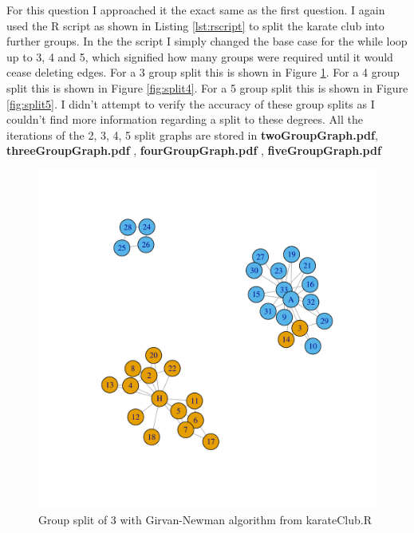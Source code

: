 \documentclass[letterpaper,11pt]{article}
\begin{document}
For this question I approached it the exact same as the first question. I again used the R script as shown in Listing \ref{lst:rscript} to split the karate club into further groups. In the the script I simply changed the base case for the while loop up to 3, 4 and 5, which signified how many groups were required until it would cease deleting edges. For a 3 group split this is shown in Figure \ref{fig:split3}. For a 4 group split this is shown in Figure \ref{fig:split4}. For a 5 group split this is shown in Figure \ref{fig:split5}. I didn't attempt to verify the accuracy of these group splits as I couldn't find more information regarding a split to these degrees.
All the iterations of the 2, 3, 4, 5 split graphs are  stored in \textbf{twoGroupGraph.pdf}, \textbf{threeGroupGraph.pdf} , \textbf{fourGroupGraph.pdf} , \textbf{fiveGroupGraph.pdf} 
\begin{figure}[h]
\centering
\includegraphics[scale=0.6]{TheeGroupFinalBarchart.pdf}
\caption{Group split of 3 with Girvan-Newman algorithm from karateClub.R}
\label{fig:split3}
\end{figure}
\end{document}
